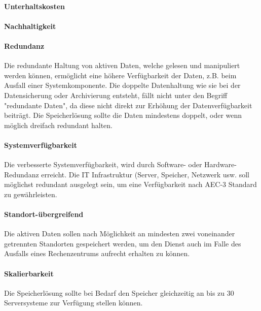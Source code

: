 \paragraph{Unterhaltskosten}\label{Soll-1-2}

\paragraph{Nachhaltigkeit}\label{Soll-1-3}

\setcounter{paragraph}{0}
\renewcommand\theparagraph{Soll-2-\arabic{paragraph}}

\paragraph{Redundanz}\label{Soll-2-1}
Die redundante Haltung von aktiven Daten, welche gelesen und manipuliert werden können, ermöglicht eine höhere Verfügbarkeit der Daten, z.B. beim Ausfall einer Systemkomponente. Die doppelte Datenhaltung wie sie bei der Datensicherung oder Archivierung entsteht, fällt nicht unter den Begriff "redundante Daten", da diese nicht direkt zur Erhöhung der Datenverfügbarkeit beiträgt. Die Speicherlösung sollte die Daten mindestens doppelt, oder wenn möglich dreifach redundant halten. 


\paragraph{Systemverfügbarkeit}\label{Soll-2-2}
Die verbesserte Systemverfügbarkeit, wird durch Software- oder Hardware-Redundanz erreicht. Die IT Infrastruktur (Server, Speicher, Netzwerk usw. soll möglichst redundant ausgelegt sein, um eine Verfügbarkeit nach AEC-3 Standard zu gewährleisten.

\paragraph{Standort-übergreifend}\label{Soll-2-3}
Die aktiven Daten sollen nach Möglichkeit an mindesten zwei voneinander getrennten Standorten gespeichert werden, um den Dienst auch im Falle des Ausfalls eines Rechenzentrums aufrecht erhalten zu können.

\setcounter{paragraph}{0}
\renewcommand\theparagraph{Soll-3-\arabic{paragraph}}

\paragraph{Skalierbarkeit}\label{Soll-3-1}
Die Speicherlösung sollte bei Bedarf den Speicher gleichzeitig an bis zu 30 Serversysteme zur Verfügung stellen können.

